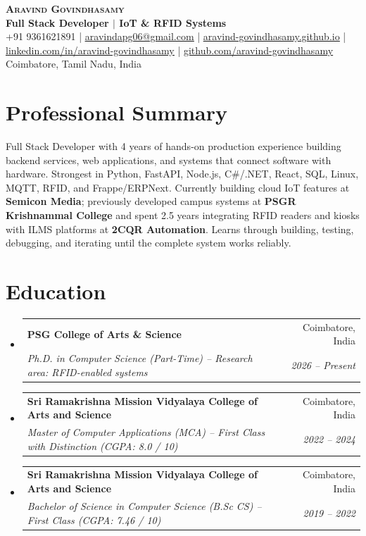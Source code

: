 \documentclass[letterpaper,10pt]{article}
\makeatletter
\newcommand{\resumeSubheading}[4]{
  \vspace{-3pt}\item
    \begin{tabular*}{0.97\textwidth}[t]{l@{\extracolsep{\fill}}r}
      \textbf{#1} & #2 \\
      \textit{\small#3} & \textit{\small #4} \\
    \end{tabular*}\vspace{-8pt}
}
\newcommand{\resumeSubHeadingListStart}{\begin{itemize}[leftmargin=0.15in, label={}, itemsep=0pt, topsep=1pt]}
\newcommand{\resumeSubHeadingListEnd}{\end{itemize}}
\makeatother
\begin{document}
\begin{center}
    \textbf{\LARGE \scshape Aravind Govindhasamy} \\ \vspace{1pt}
    \textbf{\large Full Stack Developer $\vert$ IoT \& RFID Systems} \\ \vspace{2pt}
    \small +91 9361621891 | \href{mailto:aravindapg06@gmail.com}{\underline{aravindapg06@gmail.com}} | 
    \href{https://aravind-govindhasamy.github.io}{\underline{aravind-govindhasamy.github.io}} |
    \href{https://linkedin.com/in/aravind-govindhasamy}{\underline{linkedin.com/in/aravind-govindhasamy}} |
    \href{https://github.com/aravind-govindhasamy}{\underline{github.com/aravind-govindhasamy}} \\
    \small Coimbatore, Tamil Nadu, India
\end{center}


\section{Professional Summary}
 \begin{itemize}[leftmargin=0.15in, label={}, itemsep=0pt, topsep=1pt]
    \small{\item{
     Full Stack Developer with 4 years of hands-on production experience building backend services, web applications, and systems that connect software with hardware. Strongest in Python, FastAPI, Node.js, C\#/.NET, React, SQL, Linux, MQTT, RFID, and Frappe/ERPNext. Currently building cloud IoT features at \textbf{Semicon Media}; previously developed campus systems at \textbf{PSGR Krishnammal College} and spent 2.5 years integrating RFID readers and kiosks with ILMS platforms at \textbf{2CQR Automation}. Learns through building, testing, debugging, and iterating until the complete system works reliably.
    }}
 \end{itemize}


\section{Education}
  \resumeSubHeadingListStart
    \resumeSubheading
      {PSG College of Arts \& Science}{Coimbatore, India}
      {Ph.D. in Computer Science (Part-Time) -- Research area: RFID-enabled systems}{2026 -- Present}
    \resumeSubheading
      {Sri Ramakrishna Mission Vidyalaya College of Arts and Science}{Coimbatore, India}
      {Master of Computer Applications (MCA) -- First Class with Distinction (CGPA: 8.0 / 10)}{2022 -- 2024}
    \resumeSubheading
      {Sri Ramakrishna Mission Vidyalaya College of Arts and Science}{Coimbatore, India}
      {Bachelor of Science in Computer Science (B.Sc CS) -- First Class (CGPA: 7.46 / 10)}{2019 -- 2022}
  \resumeSubHeadingListEnd
\end{document}
